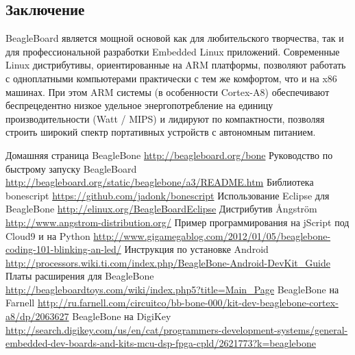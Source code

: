 \documentclass[10pt, a5paper]{article}
\begin{document}
\subsection*{Заключение}

BeagleBoard является мощной основой как для любительского творчества, так и для профессиональной разработки Embedded Linux приложений. Современные Linux дистрибутивы, ориентированные на ARM платформы, позволяют работать с одноплатными компьютерами практически с тем же комфортом, что и на x86 машинах. При этом ARM системы (в особенности Cortex-A8) обеспечивают беспрецедентно низкое удельное энергопотребление на единицу производительности (Watt / MIPS) и лидируют по компактности, позволяя строить широкий спектр портативных устройств с автономным питанием.

\begin{thebibliography}{9}
   Домашняя страница BeagleBone \url{http://beagleboard.org/bone}
   Руководство по быстрому запуску BeagleBoard \url{http://beagleboard.org/static/beaglebone/a3/README.htm}
   Библиотека bonescript \url{https://github.com/jadonk/bonescript}
   Использование Eclipse для BeagleBone \url{http://elinux.org/BeagleBoardEclipse}
   Дистрибутив \AA{}ngstr\"{o}m \url{http://www.angstrom-distribution.org/}
   Пример программирования на jScript под Cloud9 и на Python \url{http://www.gigamegablog.com/2012/01/05/beaglebone-coding-101-blinking-an-led/}
   Инструкция по установке Android \url{http://processors.wiki.ti.com/index.php/BeagleBone-Android-DevKit_Guide}
   Платы расширения для BeagleBone \url{http://beagleboardtoys.com/wiki/index.php5?title=Main_Page}
   BeagleBone на Farnell \url{http://ru.farnell.com/circuitco/bb-bone-000/kit-dev-beaglebone-cortex-a8/dp/2063627}
   BeagleBone на DigiKey \url{http://search.digikey.com/us/en/cat/programmers-development-systems/general-embedded-dev-boards-and-kits-mcu-dsp-fpga-cpld/2621773?k=beaglebone}
\end{thebibliography}
\end{document}
